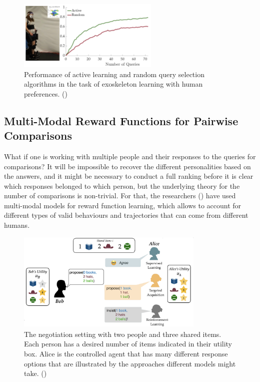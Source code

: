 \documentclass[
  letterpaper,
  DIV=11,
  numbers=noendperiod,
  oneside]{scrreprt}
\theoremstyle{remark}
\begin{document}
\begin{figure}

{\centering \includegraphics[width=0.6\textwidth,height=\textheight]{Figures/robo_graph.png}

}

\caption{Performance of active learning and random query selection
algorithms in the task of exoskeleton learning with human preferences.
()}

\end{figure}%

\subsection{Multi-Modal Reward Functions for Pairwise
Comparisons}\label{multi-modal-reward-functions-for-pairwise-comparisons}

What if one is working with multiple people and their responses to the
queries for comparisons? It will be impossible to recover the different
personalities based on the answers, and it might be necessary to conduct
a full ranking before it is clear which responses belonged to which
person, but the underlying theory for the number of comparisons is
non-trivial. For that, the researchers
() have used
multi-modal models for reward function learning, which allows to account
for different types of valid behaviours and trajectories that can come
from different humans.

\begin{figure}

{\centering \includegraphics[width=0.8\textwidth,height=\textheight]{Figures/negotiation.png}

}

\caption{The negotiation setting with two people and three shared items.
Each person has a desired number of items indicated in their utility
box. Alice is the controlled agent that has many different response
options that are illustrated by the approaches different models might
take. ()}

\end{figure}%
\end{document}
